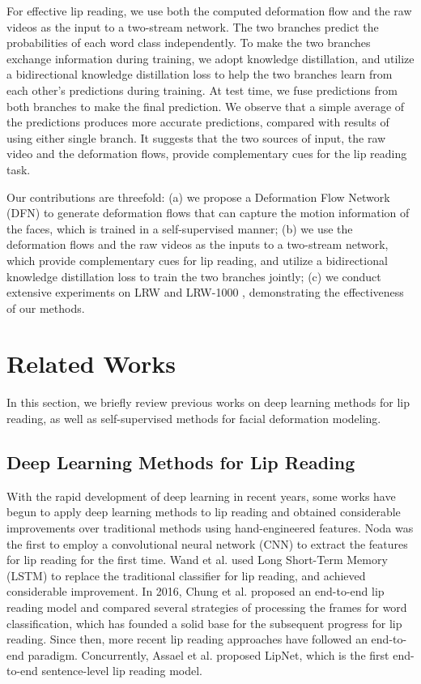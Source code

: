 \documentclass[a4paper, 10pt, conference]{ieeeconf}      \usepackage{FG2020}
\begin{document}
 For effective lip reading, we use both the computed deformation flow and the raw videos as the input to a two-stream network. The two branches predict the probabilities of each word class independently. To make the two branches exchange information during training, we adopt knowledge distillation, and utilize a bidirectional knowledge distillation loss to help the two branches learn from each other's predictions during training. At test time, we fuse predictions from both branches to make the final prediction. We observe that a simple average of the predictions produces more accurate predictions, compared with results of using either single branch. It suggests that the two sources of input, the raw video and the deformation flows, provide complementary cues for the lip reading task. 
 
 Our contributions are threefold: (a) we propose a Deformation Flow Network (DFN) to generate deformation flows that can capture the motion information of the faces, which is trained in a self-supervised manner;
 (b) we use the deformation flows and the raw videos as the inputs to a two-stream network, which provide complementary cues for lip reading, and utilize a bidirectional knowledge distillation loss to train the two branches jointly;
 (c) we conduct extensive experiments on LRW \cite{Chung2016LipRI} and LRW-1000 \cite{yang2019lrw}, demonstrating the effectiveness of our methods. 


 
 
\section{Related Works}
 \label{sec:related_works}
 


 
 In this section, we briefly review previous works on deep learning methods for lip reading, as well as self-supervised methods for facial deformation modeling.
 
 \subsection{Deep Learning Methods for Lip Reading}
 
 With the rapid development of deep learning in recent years, some works have begun to apply deep learning methods to lip reading and obtained considerable improvements over traditional methods using hand-engineered features.
 Noda \cite{Noda2014LipreadingUC} was the first to employ a convolutional neural network (CNN) to extract the features for lip reading for the first time. Wand et al. \cite{Wand2016LipreadingWL} used Long Short-Term Memory (LSTM) to replace the traditional classifier for lip reading, and achieved considerable improvement. 
 In 2016, Chung et al. \cite{Chung2016LipRI} proposed an end-to-end lip reading model and compared several strategies of processing the frames for word classification, which has founded a solid base for the subsequent progress for lip reading. Since then, more recent lip reading approaches have followed an end-to-end paradigm. Concurrently, Assael et al. \cite{Assael2016LipNetSL} proposed LipNet,
 which is the first end-to-end sentence-level lip reading model. 
\end{document}
